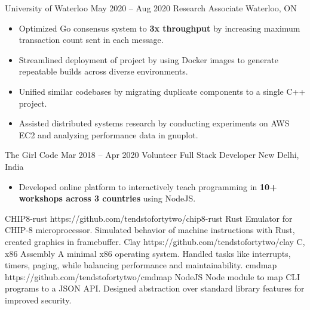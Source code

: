 \documentclass{article}
\begin{document}
\WorkEntry
  {University of Waterloo}
  {May 2020 -- Aug 2020}
  {Research Associate \hfill Waterloo, ON}
  {
    \begin{itemize} \itemsep -1pt
      \item Optimized Go consensus system to \textbf{3x throughput} by increasing maximum transaction count sent in each message.
      \item Streamlined deployment of project by using Docker images to generate repeatable builds across diverse environments.
      \item Unified similar codebases by migrating duplicate components to a single  C++ project.
      \item Assisted distributed systems research by conducting experiments on AWS EC2 and analyzing performance data in gnuplot.
    \end{itemize}
  }
\WorkEntry
  {The Girl Code}
  {Mar 2018 -- Apr 2020}
  {Volunteer Full Stack Developer \hfill New Delhi, India}
  {
    \begin{itemize} \itemsep -1pt
      \item Developed online platform to interactively teach programming in \textbf{10+ workshops across 3 countries} using NodeJS.
    \end{itemize}
  }

\ProjectEntry
  {CHIP8-rust}
  {https://github.com/tendstofortytwo/chip8-rust}
  {Rust}
  {Emulator for CHIP-8 microprocessor. Simulated behavior of machine instructions with Rust, created graphics in framebuffer.}
\vspace{1.5mm}
\ProjectEntry
  {Clay}
  {https://github.com/tendstofortytwo/clay}
  {C, x86 Assembly}
  {A minimal x86 operating system. Handled tasks like interrupts, timers, paging, while balancing performance and maintainability.}
\vspace{1.5mm}
\ProjectEntry
  {cmdmap}
  {https://github.com/tendstofortytwo/cmdmap}
  {NodeJS}
  {Node module to map CLI programs to a JSON API. Designed abstraction over standard library features for improved security.}
\end{document}
